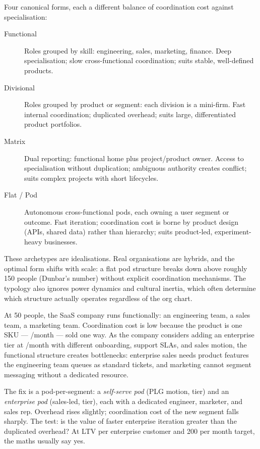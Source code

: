Four canonical forms, each a different balance of coordination cost against specialisation:
\begin{description}
  \item[Functional] Roles grouped by skill: engineering, sales, marketing, finance. Deep specialisation; slow cross-functional coordination; suits stable, well-defined products.
  \item[Divisional] Roles grouped by product or segment: each division is a mini-firm. Fast internal coordination; duplicated overhead; suits large, differentiated product portfolios.
  \item[Matrix] Dual reporting: functional home plus project/product owner. Access to specialisation without duplication; ambiguous authority creates conflict; suits complex projects with short lifecycles.
  \item[Flat / Pod] Autonomous cross-functional pods, each owning a user segment or outcome. Fast iteration; coordination cost is borne by product design (APIs, shared data) rather than hierarchy; suits product-led, experiment-heavy businesses.
\end{description}
These archetypes are idealisations. Real organisations are hybrids, and the optimal form shifts with scale: a flat pod structure breaks down above roughly 150 people (Dunbar's number) without explicit coordination mechanisms. The typology also ignores power dynamics and cultural inertia, which often determine which structure actually operates regardless of the org chart.

\begin{example}
At 50 people, the SaaS company runs functionally: an engineering team, a sales team, a marketing team. Coordination cost is low because the product is one SKU --- /month --- sold one way. As the company considers adding an enterprise tier at /month with different onboarding, support SLAs, and sales motion, the functional structure creates bottlenecks: enterprise sales needs product features the engineering team queues as standard tickets, and marketing cannot segment messaging without a dedicated resource.

The fix is a pod-per-segment: a \emph{self-serve pod} (PLG motion,  tier) and an \emph{enterprise pod} (sales-led,  tier), each with a dedicated engineer, marketer, and sales rep. Overhead rises slightly; coordination cost of the new segment falls sharply. The test: is the value of faster enterprise iteration greater than the duplicated overhead? At  LTV per enterprise customer and \num{200} per month target, the maths usually say yes.
\end{example}

